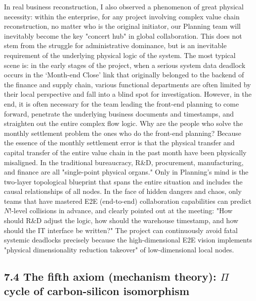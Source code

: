 \documentclass[11pt,a4paper]{article}
\begin{document}
In real business reconstruction, I also observed a phenomenon of great physical necessity: within the enterprise, for any project involving complex value chain reconstruction, no matter who is the original initiator, our Planning team will inevitably become the key "concert hub" in global collaboration. This does not stem from the struggle for administrative dominance, but is an inevitable requirement of the underlying physical logic of the system. The most typical scene is: in the early stages of the project, when a serious system data deadlock occurs in the ‘Month-end Close’ link that originally belonged to the backend of the finance and supply chain, various functional departments are often limited by their local perspective and fall into a blind spot for investigation. However, in the end, it is often necessary for the team leading the front-end planning to come forward, penetrate the underlying business documents and timestamps, and straighten out the entire complex flow logic. Why are the people who solve the monthly settlement problem the ones who do the front-end planning? Because the essence of the monthly settlement error is that the physical transfer and capital transfer of the entire value chain in the past month have been physically misaligned. In the traditional bureaucracy, R\&D, procurement, manufacturing, and finance are all "single-point physical organs." Only in Planning's mind is the two-layer topological blueprint that spans the entire situation and includes the causal relationships of all nodes. In the face of hidden dangers and chaos, only teams that have mastered E2E (end-to-end) collaboration capabilities can predict $N!$-level collisions in advance, and clearly pointed out at the meeting: "How should R\&D adjust the logic, how should the warehouse timestamp, and how should the IT interface be written?" The project can continuously avoid fatal systemic deadlocks precisely because the high-dimensional E2E vision implements "physical dimensionality reduction takeover" of low-dimensional local nodes.


\subsection*{7.4 The fifth axiom (mechanism theory): $\Pi$ cycle of carbon-silicon isomorphism}
\end{document}

